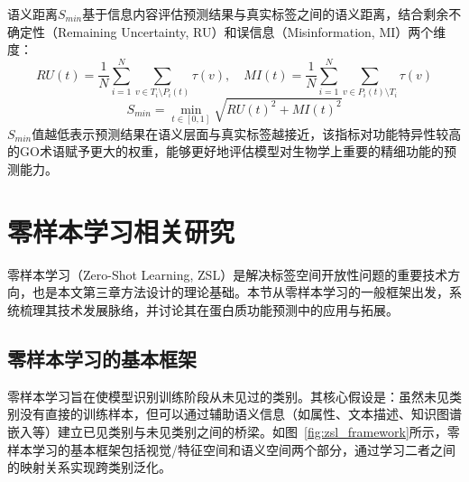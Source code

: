 语义距离$S_{min}$基于信息内容评估预测结果与真实标签之间的语义距离，结合剩余不确定性（Remaining Uncertainty, RU）和误信息（Misinformation, MI）两个维度：
\begin{equation}
    RU(t) = \frac{1}{N} \sum_{i=1}^{N} \sum_{v \in T_i \setminus P_i(t)} \tau(v), \quad MI(t) = \frac{1}{N} \sum_{i=1}^{N} \sum_{v \in P_i(t) \setminus T_i} \tau(v)
\end{equation}
\begin{equation}
    S_{min} = \min_{t \in [0, 1]} \sqrt{RU(t)^2 + MI(t)^2}
\end{equation}
$S_{min}$值越低表示预测结果在语义层面与真实标签越接近，该指标对功能特异性较高的GO术语赋予更大的权重，能够更好地评估模型对生物学上重要的精细功能的预测能力。

\section{零样本学习相关研究}

零样本学习（Zero-Shot Learning, ZSL）是解决标签空间开放性问题的重要技术方向，也是本文第三章方法设计的理论基础。本节从零样本学习的一般框架出发，系统梳理其技术发展脉络，并讨论其在蛋白质功能预测中的应用与拓展。

\subsection{零样本学习的基本框架}

零样本学习旨在使模型识别训练阶段从未见过的类别。其核心假设是：虽然未见类别没有直接的训练样本，但可以通过辅助语义信息（如属性、文本描述、知识图谱嵌入等）建立已见类别与未见类别之间的桥梁。如图~\ref{fig:zsl_framework}所示，零样本学习的基本框架包括视觉/特征空间和语义空间两个部分，通过学习二者之间的映射关系实现跨类别泛化。

